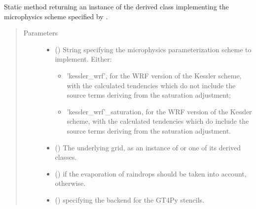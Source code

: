 \documentclass[letterpaper,10pt,english]{sphinxmanual}
\begin{document}
\begin{fulllineitems}
\begin{fulllineitems}
\end{fulllineitems}


\begin{fulllineitems}
\label{\detokenize{api:tasmania.parameterizations.slow_tendencies.SlowTendencyMicrophysics.factory}}
Static method returning an instance of the derived class implementing the microphysics scheme
specified by .
\begin{quote}\begin{description}
\item[{Parameters}] \leavevmode\begin{itemize}
\item {} 
 () \textendash{} 
String specifying the microphysics parameterization scheme to implement. Either:
\begin{itemize}
\item {} 
’kessler\_wrf’, for the WRF version of the Kessler scheme, with the calculated tendencies which                                do not include the source terms deriving from the saturation adjustment;

\item {} 
’kessler\_wrf’\_saturation, for the WRF version of the Kessler scheme, with the calculated tendencies which                             do include the source terms deriving from the saturation adjustment.

\end{itemize}


\item {} 
 () \textendash{} The underlying grid, as an instance of {\hyperref[\detokenize{api:tasmania.grids.grid_xyz.GridXYZ}]{}} or one of its derived classes.

\item {} 
 () \textendash{}  if the evaporation of raindrops should be taken into account,  otherwise.

\item {} 
 () \textendash{}  specifying the backend for the GT4Py stencils.


\end{itemize}
\end{description}
\end{quote}
\end{fulllineitems}
\end{fulllineitems}
\end{document}
